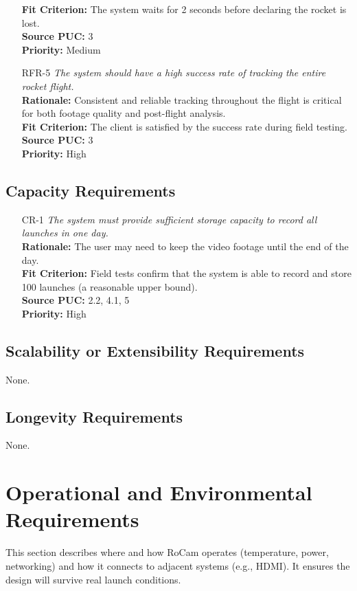 \documentclass[12pt]{article}
\begin{document}
\begin{itemize}[leftmargin=*]
        \textbf{Fit Criterion:} The system waits for 2 seconds before declaring the rocket is lost.\\
        \textbf{Source PUC:} 3 \\
        \textbf{Priority:} Medium
  \item[RFR-5] \emph{The system should have a high success rate of tracking the entire
          rocket flight.}\\[2mm]
        \textbf{Rationale:} Consistent and reliable tracking throughout the flight is critical for both footage quality and post-flight analysis.\\
        \textbf{Fit Criterion:} The client is satisfied by the success rate during field testing.\\
        \textbf{Source PUC:} 3 \\
        \textbf{Priority:} High
\end{itemize}

\subsection{Capacity Requirements}
\begin{itemize}[leftmargin=*]
  \item[CR-1] \emph{The system must provide sufficient storage capacity to record all
          launches in one day.}\\[2mm]
        \textbf{Rationale:} The user may need to keep the video footage until the end of the day.\\
        \textbf{Fit Criterion:} Field tests confirm that the system is able to record and store 100 launches (a reasonable upper bound).\\
        \textbf{Source PUC:} 2.2, 4.1, 5 \\
        \textbf{Priority:} High
\end{itemize}

\subsection{Scalability or Extensibility Requirements}

None.

\subsection{Longevity Requirements}

None.

\section{Operational and Environmental Requirements}
This section describes where and how RoCam operates (temperature, power, networking) and how it connects to adjacent systems (e.g., HDMI).
It ensures the design will survive real launch conditions.
\end{document}
